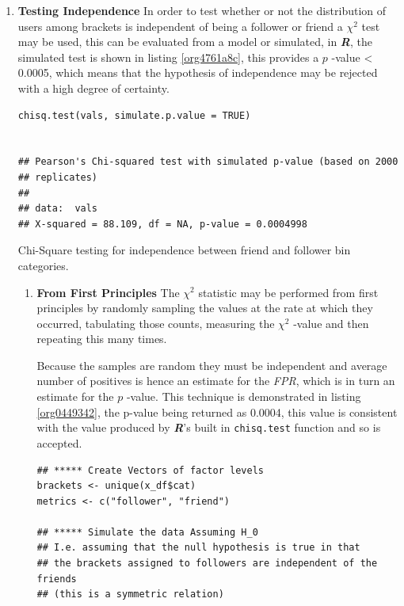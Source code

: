 \documentclass[11pt]{article}
\begin{document}
\begin{enumerate}
\item \textbf{Testing Independence}
\label{sec:orga09fddd}
\newline
In order to test whether or not the distribution of users among brackets is
independent of being a follower or friend a \(\chi^{2}\) test may be used, this
can be evaluated from a model or simulated, in \textbf{\emph{R}}, the simulated test is
shown in listing \ref{org4761a8c}, this provides a \(p\) -value < 0.0005, which means that the hypothesis of independence may be rejected with a high degree of certainty.

\begin{listing}[htbp]
\begin{verbatim}
chisq.test(vals, simulate.p.value = TRUE)


## Pearson's Chi-squared test with simulated p-value (based on 2000
## replicates)
##
## data:  vals
## X-squared = 88.109, df = NA, p-value = 0.0004998
\end{verbatim}
\caption{\label{org4761a8c}Chi-Square testing for independence between friend and follower bin categories.}
\end{listing}

\begin{enumerate}
\item \textbf{From First Principles}
\label{sec:org1f8a7e7}
\newline
The \(\chi^{2}\) statistic may be performed from first principles by randomly
sampling the values at the rate at which they occurred, tabulating those counts, measuring the \(\chi^{2}\) -value and then repeating this many times.

Because the samples are random they must be independent and average number of
positives is hence an estimate for the \emph{FPR}, which is in turn an estimate for
the \(p\) -value. This technique is demonstrated in listing \ref{org0449342}, the p-value
being returned as 0.0004, this value is consistent with the value produced by
\textbf{\emph{R}}'s built in \texttt{chisq.test} function and so is accepted.

\begin{listing}[htbp]
\begin{verbatim}
## ***** Create Vectors of factor levels
brackets <- unique(x_df$cat)
metrics <- c("follower", "friend")

## ***** Simulate the data Assuming H_0
## I.e. assuming that the null hypothesis is true in that
## the brackets assigned to followers are independent of the friends
## (this is a symmetric relation)


\end{verbatim}
\end{listing}
\end{enumerate}
\end{enumerate}
\end{document}
